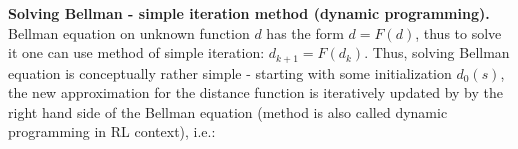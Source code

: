 \documentclass[reqno,11pt]{amsart}
\begin{document}






 

{\bf Solving Bellman - simple iteration method (dynamic programming).} 
Bellman equation on unknown function $d$ has the form $d = F(d)$, thus to solve it one can use method of simple iteration:
$d_{k+1} = F (d_{k} )$. 
Thus, solving Bellman equation is conceptually rather simple - %
starting with some initialization $d_0(s)$, the new approximation for the distance function is iteratively updated by
by the right hand side of the Bellman equation (method is also called dynamic programming in RL context), i.e.:
\end{document}

